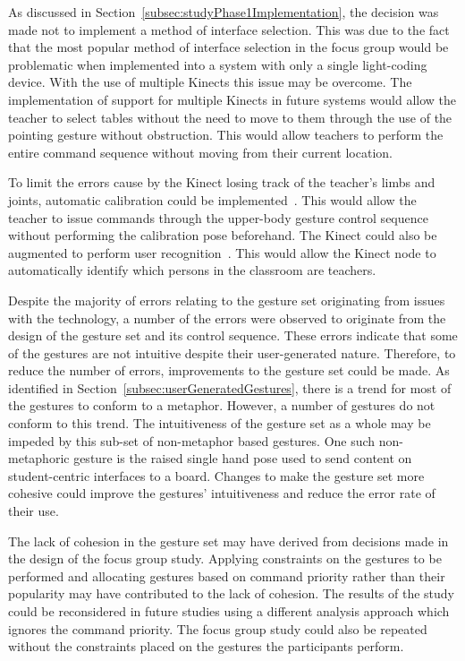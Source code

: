 \documentclass[link]{IWCOMP}
\begin{document}
As discussed in Section~\ref{subsec:studyPhase1Implementation}, the decision was made not to implement a method of interface selection.
This was due to the fact that the most popular method of interface selection in the focus group would be problematic when implemented into a system with only a single light-coding device.
With the use of multiple Kinects this issue may be overcome. 
The implementation of support for multiple Kinects in future systems would allow the teacher to select tables without the need to move to them through the use of the pointing gesture without obstruction.
This would allow teachers to perform the entire command sequence without moving from their current location.

To limit the errors cause by the Kinect losing track of the teacher's limbs and joints, automatic calibration could be implemented~\cite{Bellmore2011}.
This would allow the teacher to issue commands through the upper-body gesture control sequence without performing the calibration pose beforehand.
The Kinect could also be augmented to perform user recognition~\cite{Leyvand2011}.
This would allow the Kinect node to automatically identify which persons in the classroom are teachers.

Despite the majority of errors relating to the gesture set originating from issues with the technology, a number of the errors were observed to originate from the design of the gesture set and its control sequence.
These errors indicate that some of the gestures are not intuitive despite their user-generated nature.
Therefore, to reduce the number of errors, improvements to the gesture set could be made.
As identified in Section~\ref{subsec:userGeneratedGestures}, there is a trend for most of the gestures to conform to a metaphor.
However, a number of gestures do not conform to this trend.
The intuitiveness of the gesture set as a whole may be impeded by this sub-set of non-metaphor based gestures.
One such non-metaphoric gesture is the raised single hand pose used to send content on student-centric interfaces to a board.
Changes to make the gesture set more cohesive could improve the gestures' intuitiveness and reduce the error rate of their use.

The lack of cohesion in the gesture set may have derived from decisions made in the design of the focus group study.
Applying constraints on the gestures to be performed and allocating gestures based on command priority rather than their popularity may have contributed to the lack of cohesion.
The results of the study could be reconsidered in future studies using a different analysis approach which ignores the command priority.
The focus group study could also be repeated without the constraints placed on the gestures the participants perform.
\end{document}
